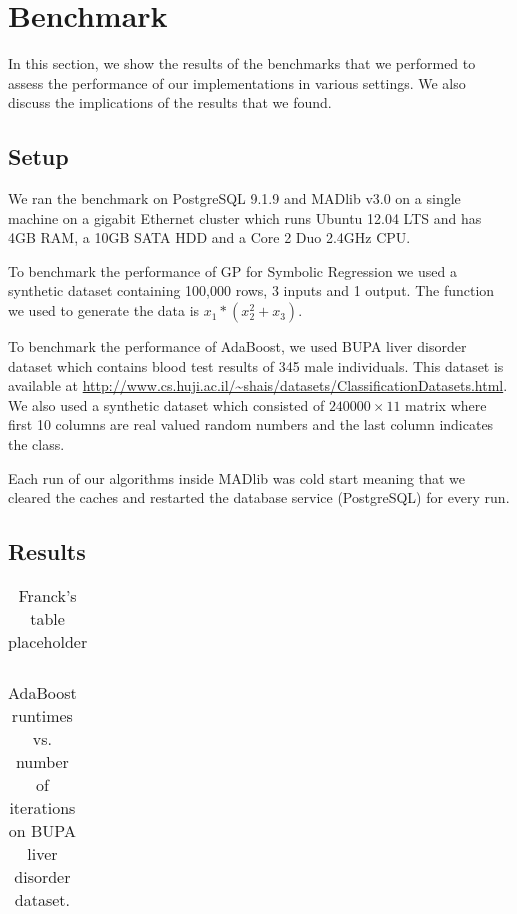 
\section{Benchmark}
\label{sec:bench}
In this section, we show the results of the benchmarks that we performed to assess the performance of our implementations in various settings. We also discuss the implications of the results that we found.
\subsection{Setup}
We ran the benchmark on PostgreSQL 9.1.9 and MADlib v3.0 on a single machine on a gigabit Ethernet cluster which runs Ubuntu 12.04 LTS and has 4GB RAM, a 10GB SATA HDD and a Core 2 Duo 2.4GHz CPU. 

To benchmark the performance of GP for Symbolic Regression we used a synthetic dataset containing 100,000 rows, 3 inputs and 1 output. The function we used to generate the data is $x_1*(x_2^2+x_3)$.

To benchmark the performance of AdaBoost, we used BUPA liver disorder dataset which contains blood test results of 345 male individuals. This dataset is available at \url{http://www.cs.huji.ac.il/~shais/datasets/ClassificationDatasets.html}. We also used a synthetic dataset which consisted of $240000\times11$ matrix where first 10 columns are real valued random numbers and the last column indicates the class.

Each run of our algorithms inside MADlib was cold start meaning that we cleared the caches and restarted the database service (PostgreSQL) for every run.
\subsection{Results}

\begin{table}[!htbp]
\centering
\begin{tabular}{lcc}
\end{tabular}
\caption{Franck's table placeholder}
\label{tab:gp}
\end{table}

\begin{table}[!htbp]
\centering
\begin{tabular}{lcc}
\end{tabular}
\caption{AdaBoost runtimes vs. number of iterations on BUPA liver disorder dataset.}
\label{tab:adaBupa1}
\end{table}

